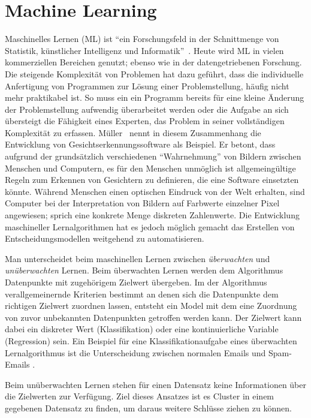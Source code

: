 \chapter{Machine Learning}
\label{ch:machine_learning}
Maschinelles Lernen (ML) ist \enquote{ein Forschungsfeld in der Schnittmenge von Statistik, künstlicher Intelligenz und Informatik}~\cite[S.~1]{Muller.2017}. Heute wird ML in vielen kommerziellen Bereichen genutzt; ebenso wie in der datengetriebenen Forschung. Die steigende Komplexität von Problemen hat dazu geführt, dass die individuelle Anfertigung von Programmen zur Lösung einer Problemstellung, häufig nicht mehr praktikabel ist. So muss ein ein Programm bereits für eine kleine Änderung der Problemstellung aufwendig überarbeitet werden oder die Aufgabe an sich übersteigt die Fähigkeit eines Experten, das Problem in seiner vollständigen Komplexität zu erfassen. Müller~\cite{Muller.2017} nennt in diesem Zusammenhang die Entwicklung von Gesichtserkennungssoftware als Beispiel. Er betont, dass aufgrund der grundsätzlich verschiedenen \enquote{Wahrnehmung} von Bildern zwischen Menschen und Computern, es für den Menschen unmöglich ist allgemeingültige Regeln zum Erkennen von Gesichtern zu definieren, die eine Software einsetzten könnte. Während Menschen einen optischen Eindruck von der Welt erhalten, sind Computer bei der Interpretation von Bildern auf Farbwerte einzelner Pixel angewiesen; sprich eine konkrete Menge diskreten Zahlenwerte. Die Entwicklung maschineller Lernalgorithmen hat es jedoch möglich gemacht das Erstellen von Entscheidungsmodellen weitgehend zu automatisieren.  

Man unterscheidet beim maschinellen Lernen zwischen \textit{überwachten} und \textit{unüberwachten} Lernen. Beim überwachten Lernen werden dem Algorithmus Datenpunkte mit zugehörigem Zielwert übergeben. Im der Algorithmus verallgemeinernde Kriterien bestimmt an denen sich die Datenpunkte dem richtigen Zielwert zuordnen lassen, entsteht ein Model mit dem eine Zuordnung von zuvor unbekannten Datenpunkten getroffen werden kann. Der Zielwert kann dabei ein diskreter Wert (Klassifikation) oder eine kontinuierliche Variable (Regression) sein. Ein Beispiel für eine Klassifikationaufgabe eines überwachten Lernalgorithmus ist die Unterscheidung zwischen normalen Emails und Spam-Emails \cite[S.~2]{Muller.2017}.

Beim unüberwachten Lernen stehen für einen Datensatz keine Informationen über die Zielwerten zur Verfügung. Ziel dieses Ansatzes ist es Cluster in einem gegebenen Datensatz zu finden, um daraus weitere Schlüsse ziehen zu können.

